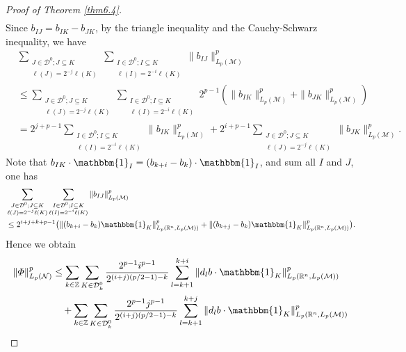 \documentclass[oneside,english,a4wide]{amsart}
\numberwithin{equation}{section}
\numberwithin{figure}{section}
\theoremstyle{plain}
\theoremstyle{plain}
\theoremstyle{definition}
\theoremstyle{plain}
\theoremstyle{remark}
\theoremstyle{definition}
\theoremstyle{remark}
\theoremstyle{definition}
\newcommand{\8}{\infty}
\begin{document}
\begin{proof}[Proof of Theorem \ref{thm6.4}]
\begin{equation*}
\begin{aligned}
	\end{aligned}
\end{equation*}
Since $b_{IJ}=b_{IK}-b_{JK}$, by the triangle inequality and the Cauchy-Schwarz inequality, we have
\begin{equation}
	\begin{aligned}
		{}&\sum_{\substack{J\in\mathcal{D}^0;J\subseteq K\\ \ell(J)=2^{-j}\ell(K)}}\sum_{\substack{I\in\mathcal{D}^0;I\subseteq K\\ \ell(I)=2^{-i}\ell(K)}}\|b_{IJ}\|_{L_p(\mathcal{M})}^p\\
		&\leq \sum_{\substack{J\in\mathcal{D}^0;J\subseteq K\\ \ell(J)=2^{-j}\ell(K)}}\sum_{\substack{I\in\mathcal{D}^0;I\subseteq K\\ \ell(I)=2^{-i}\ell(K)}} 2^{p-1}(\|b_{IK}\|_{L_p(\mathcal{M})}^p+\|b_{JK}\|_{L_p(\mathcal{M})}^p)\\
		&= 2^{j+p-1}\sum_{\substack{I\in\mathcal{D}^0;I\subseteq K\\ \ell(I)=2^{-i}\ell(K)}}\|b_{IK}\|_{L_p(\mathcal{M})}^p+2^{i+p-1}\sum_{\substack{J\in\mathcal{D}^0;J\subseteq K\\ \ell(J)=2^{-j}\ell(K)}}\|b_{JK}\|_{L_p(\mathcal{M})}^p.
	\end{aligned}
\end{equation}
Note that $b_{IK}\cdot \mathbbm{1}_I=(b_{k+i}-b_{k})\cdot \mathbbm{1}_I$, and sum all $I$ and $J$, one has
\begin{equation}
	\begin{aligned}
		{}&\sum_{\substack{J\in\mathcal{D}^0;J\subseteq K\\ \ell(J)=2^{-j}\ell(K)}}\sum_{\substack{I\in\mathcal{D}^0;I\subseteq K\\ \ell(I)=2^{-i}\ell(K)}}\|b_{IJ}\|_{L_p(\mathcal{M})}^p\\
		&\le 2^{i+j+k+p-1}\big(\|(b_{k+i}-b_{k})\mathbbm{1}_K\|_{L_p(\mathbb{R}^n,L_p(\mathcal{M}))}^p+\|(b_{k+j}-b_{k})\mathbbm{1}_K\|_{L_p(\mathbb{R}^n,L_p(\mathcal{M}))}^p\big).
	\end{aligned}
\end{equation}
Hence we obtain
\begin{equation*}
	\begin{aligned}
		\|\varPhi\|_{L_p(\mathcal{N})}^p{}
		&\le \sum_{k\in\mathbb{Z}}\sum_{K\in\mathcal{D}^0_k}\frac{2^{p-1}i^{p-1}}{2^{(i+j)(p/2-1)-k}}\sum_{l=k+1}^{k+i}\|d_lb\cdot \mathbbm{1}_K\|_{L_p(\mathbb{R}^n,L_p(\mathcal{M}))}^p\\
		&\quad+\sum_{k\in\mathbb{Z}}\sum_{K\in\mathcal{D}^0_k}\frac{2^{p-1}j^{p-1}}{2^{(i+j)(p/2-1)-k}}\sum_{l=k+1}^{k+j}\|d_lb\cdot \mathbbm{1}_K\|_{L_p(\mathbb{R}^n,L_p(\mathcal{M}))}^p\\

\end{aligned}
\end{equation*}
\end{proof}
\end{document}
